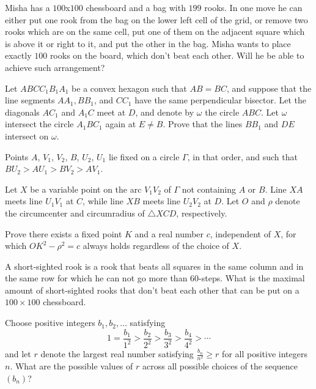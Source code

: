 \documentclass[11pt]{scrartcl}
\begin{document}
\begin{problem}[614247648874042]
Misha has a $100$x$100$ chessboard and a bag with $199$ rooks. In one move he can either put one rook from the bag on the lower left cell of the grid, or remove two rooks which are on the same cell, put one of them on the adjacent square which is above it or right to it, and put the other in the bag. Misha wants to place exactly $100$ rooks on the board, which don't beat each other. Will he be able to achieve such arrangement?
\end{problem}
\begin{problem}[876239022447910]
	Let $ABCC_1B_1A_1$ be a convex hexagon such that $AB=BC$, and suppose that the line segments $AA_1, BB_1$, and $CC_1$ have the same perpendicular bisector. Let the diagonals $AC_1$ and $A_1C$ meet at $D$, and denote by $\omega$ the circle $ABC$. Let $\omega$ intersect the circle $A_1BC_1$ again at $E \neq B$. Prove that the lines $BB_1$ and $DE$ intersect on $\omega$.
\end{problem}
\begin{problem}[315159980103862]
	Points $A$, $V_1$, $V_2$, $B$, $U_2$, $U_1$ lie fixed on a circle $\Gamma$, in that order, and such that $BU_2 > AU_1 > BV_2 > AV_1$.

Let $X$ be a variable point on the arc $V_1 V_2$ of $\Gamma$ not containing $A$ or $B$. Line $XA$ meets line $U_1 V_1$ at $C$, while line $XB$ meets line $U_2 V_2$ at $D$. Let $O$ and $\rho$ denote the circumcenter and circumradius of $\triangle XCD$, respectively.

Prove there exists a fixed point $K$ and a real number $c$, independent of $X$, for which $OK^2 - \rho^2 = c$ always holds regardless of the choice of $X$.
\end{problem}
\begin{problem}[105422576188851]
A short-sighted rook is a rook that beats all squares in the same column and in the same row for which he can not go more than $60$-steps.
What is the maximal amount of short-sighted rooks that don't beat each other that can be put on a $100\times 100$ chessboard.
\end{problem}
\begin{problem}[6666334949338369993]
	Choose positive integers $b_1, b_2, \dotsc$ satisfying
\[1=\frac{b_1}{1^2} > \frac{b_2}{2^2} > \frac{b_3}{3^2} > \frac{b_4}{4^2} > \dotsb\]and let $r$ denote the largest real number satisfying $\tfrac{b_n}{n^2} \geq r$ for all positive integers $n$. What are the possible values of $r$ across all possible choices of the sequence $(b_n)$?
\end{problem}
\end{document}
